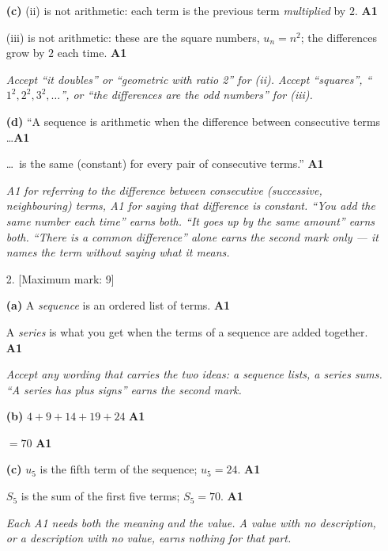 \documentclass[12pt, twoside]{article}
\begin{document}
\begin{enumerate}[itemsep=0.3cm]
\textbf{(c)} (ii) is not arithmetic: each term is the previous term
\emph{multiplied} by $2$. \hfill \textbf{A1}

(iii) is not arithmetic: these are the square numbers, $u_{n} = n^{2}$; the
differences grow by $2$ each time. \hfill \textbf{A1}

\emph{Accept ``it doubles'' or ``geometric with ratio 2'' for (ii). Accept
``squares'', ``$1^{2}, 2^{2}, 3^{2}, \ldots$'', or ``the differences are the
odd numbers'' for (iii).}

\medskip

\textbf{(d)} ``A sequence is arithmetic when the difference between
consecutive terms \ldots \hfill \textbf{A1}

\ldots\ is the same (constant) for every pair of consecutive terms.''
\hfill \textbf{A1}

\emph{A1 for referring to the difference between consecutive (successive,
neighbouring) terms, A1 for saying that difference is constant. ``You add the
same number each time'' earns both. ``It goes up by the same amount'' earns
both. ``There is a common difference'' alone earns the second mark only ---
it names the term without saying what it means.}

\newpage

\item[2.] [Maximum mark: 9]

\medskip

\textbf{(a)} A \emph{sequence} is an ordered list of terms.
\hfill \textbf{A1}

A \emph{series} is what you get when the terms of a sequence are added
together. \hfill \textbf{A1}

\emph{Accept any wording that carries the two ideas: a sequence lists,
a series sums. ``A series has plus signs'' earns the second mark.}

\medskip

\textbf{(b)} $4 + 9 + 14 + 19 + 24$ \hfill \textbf{A1}

$= 70$ \hfill \textbf{A1}

\medskip

\textbf{(c)} $u_{5}$ is the fifth term of the sequence; $u_{5} = 24$.
\hfill \textbf{A1}

$S_{5}$ is the sum of the first five terms; $S_{5} = 70$.
\hfill \textbf{A1}

\emph{Each A1 needs both the meaning and the value. A value with no
description, or a description with no value, earns nothing for that part.}


\end{enumerate}
\end{document}
